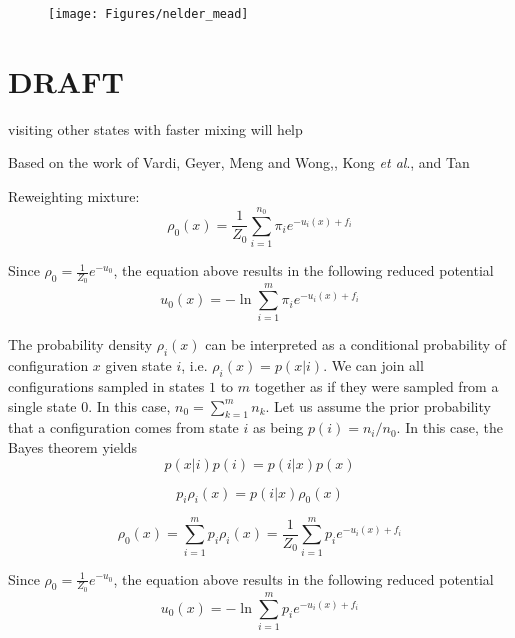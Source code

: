 \documentclass[aip,jcp,preprint,amsmath,amssymb]{revtex4-1}
\begin{document}
\begin{figure}
\centering
\texttt{[image: Figures/nelder\_mead]}
\caption{}
\label{fig:nelder_mead}
\end{figure}


\section{DRAFT}

visiting other states with faster mixing will help 

Based on the work of Vardi,\cite{Vardi_1985} Geyer,\cite{Geyer_1994} Meng and Wong,\cite{Meng_1996}, Kong \textit{et al}.\cite{Kong_2003}, and Tan\cite{Tan_2004}

Reweighting mixture\cite{Geyer_1994}:
\begin{equation*}
\rho_0(x) = \frac{1}{Z_0} \sum_{i=1}^{n_0} \pi_i e^{-u_i(x) + f_i}
\end{equation*}

Since $\rho_0 = \frac{1}{Z_0} e^{-u_0}$, the equation above results in the following reduced potential
\begin{equation}
\label{eq:mbar_reduced_potential}
u_0(x) = -\ln \sum_{i=1}^m \pi_i e^{-u_i(x) + f_i}
\end{equation}





The probability density $\rho_i(x)$ can be interpreted as a conditional probability of configuration $x$ given state $i$, i.e. $\rho_i(x) = p(x|i)$. We can join all configurations sampled in states $1$ to $m$ together as if they were sampled from a single state $0$. In this case, $n_0 = \sum_{k=1}^m n_k$. Let us assume the prior probability that a configuration comes from state $i$ as being $p(i) = n_i/n_0$. In this case, the Bayes theorem yields
\begin{equation*}
p(x|i) p(i) = p(i|x) p(x)
\end{equation*}

\begin{equation*}
p_i \rho_i(x) = p(i|x) \rho_0(x)
\end{equation*}

\begin{equation}
\label{eq:mbar_probability_density}
\rho_0(x) = \sum_{i=1}^m p_i \rho_i(x) = \frac{1}{Z_0} \sum_{i=1}^m p_i e^{-u_i(x) + f_i}
\end{equation}

Since $\rho_0 = \frac{1}{Z_0} e^{-u_0}$, the equation above results in the following reduced potential
\begin{equation}
\label{eq:mbar_reduced_potential}
u_0(x) = -\ln \sum_{i=1}^m p_i e^{-u_i(x) + f_i}
\end{equation}
\end{document}
